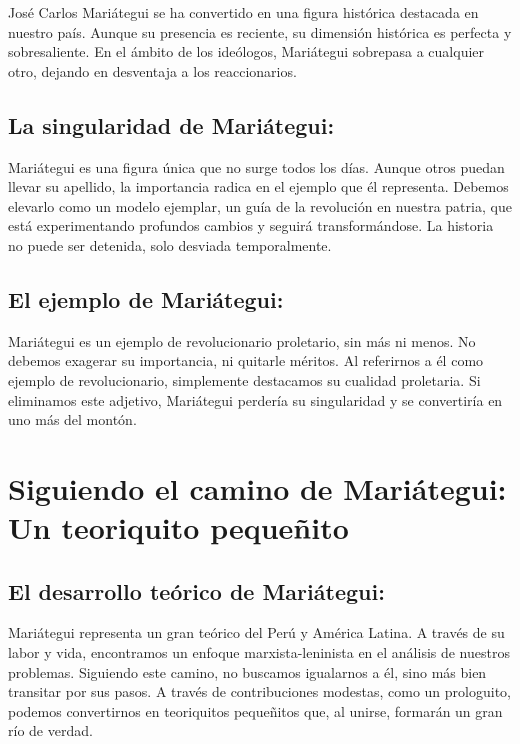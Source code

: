 \documentclass[
  letterpaper,
  DIV=11,
  numbers=noendperiod]{scrartcl}
\begin{document}
José Carlos Mariátegui se ha convertido en una figura histórica
destacada en nuestro país. Aunque su presencia es reciente, su dimensión
histórica es perfecta y sobresaliente. En el ámbito de los ideólogos,
Mariátegui sobrepasa a cualquier otro, dejando en desventaja a los
reaccionarios.

\hypertarget{la-singularidad-de-mariuxe1tegui}{%
\subsection{La singularidad de
Mariátegui:}\label{la-singularidad-de-mariuxe1tegui}}

Mariátegui es una figura única que no surge todos los días. Aunque otros
puedan llevar su apellido, la importancia radica en el ejemplo que él
representa. Debemos elevarlo como un modelo ejemplar, un guía de la
revolución en nuestra patria, que está experimentando profundos cambios
y seguirá transformándose. La historia no puede ser detenida, solo
desviada temporalmente.

\hypertarget{el-ejemplo-de-mariuxe1tegui}{%
\subsection{El ejemplo de
Mariátegui:}\label{el-ejemplo-de-mariuxe1tegui}}

Mariátegui es un ejemplo de revolucionario proletario, sin más ni menos.
No debemos exagerar su importancia, ni quitarle méritos. Al referirnos a
él como ejemplo de revolucionario, simplemente destacamos su cualidad
proletaria. Si eliminamos este adjetivo, Mariátegui perdería su
singularidad y se convertiría en uno más del montón.

\hypertarget{siguiendo-el-camino-de-mariuxe1tegui-un-teoriquito-pequeuxf1ito}{%
\section{Siguiendo el camino de Mariátegui: Un teoriquito
pequeñito}\label{siguiendo-el-camino-de-mariuxe1tegui-un-teoriquito-pequeuxf1ito}}

\hypertarget{el-desarrollo-teuxf3rico-de-mariuxe1tegui}{%
\subsection{El desarrollo teórico de
Mariátegui:}\label{el-desarrollo-teuxf3rico-de-mariuxe1tegui}}

Mariátegui representa un gran teórico del Perú y América Latina. A
través de su labor y vida, encontramos un enfoque marxista-leninista en
el análisis de nuestros problemas. Siguiendo este camino, no buscamos
igualarnos a él, sino más bien transitar por sus pasos. A través de
contribuciones modestas, como un prologuito, podemos convertirnos en
teoriquitos pequeñitos que, al unirse, formarán un gran río de verdad.
\end{document}
